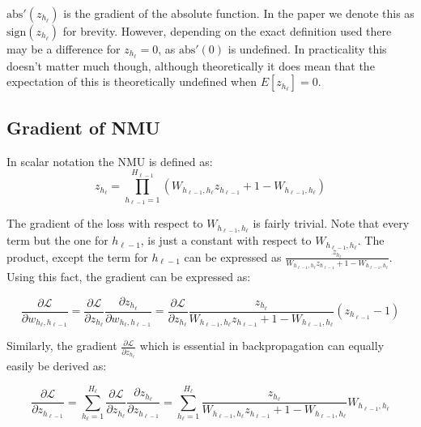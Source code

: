 $\mathrm{abs}'(z_{h_{\ell}})$ is the gradient of the absolute function. In the paper we denote this as $\mathrm{sign}(z_{h_{\ell}})$ for brevity. However, depending on the exact definition used there may be a difference for $z_{h_{\ell}} = 0$, as $\mathrm{abs}'(0)$ is undefined. In practicality this doesn't matter much though, although theoretically it does mean that the expectation of this is theoretically undefined when $E[z_{h_{\ell}}] = 0$.

\subsection{Gradient of NMU}
\label{sec:appendix:gradient-derivatives:gradient-nmu}

In scalar notation the NMU is defined as:
\begin{equation}
z_{h_\ell} = \prod_{h_{\ell-1}=1}^{H_{\ell-1}} \left(W_{h_{\ell-1},h_\ell} z_{h_{\ell-1}} + 1 - W_{h_{\ell-1},h_\ell} \right)
\end{equation}

The gradient of the loss with respect to $W_{h_{\ell-1},h_\ell}$ is fairly trivial. Note that every term but the one for $h_{\ell-1}$, is just a constant with respect to $W_{h_{\ell-1},h_\ell}$. The product, except the term for $h_{\ell-1}$ can be expressed as $\frac{z_{h_\ell}}{W_{h_{\ell-1},h_\ell} z_{h_{\ell-1}} + 1 - W_{h_{\ell-1},h_\ell}}$. Using this fact, the gradient can be expressed as:

\begin{equation}
\frac{\partial \mathcal{L}}{\partial w_{h_{\ell}, h_{\ell - 1}}} = \frac{\partial \mathcal{L}}{\partial z_{h_\ell}} \frac{\partial z_{h_\ell}}{\partial w_{h_{\ell}, h_{\ell - 1}}} = \frac{\partial \mathcal{L}}{\partial z_{h_\ell}} \frac{z_{h_\ell}}{W_{h_{\ell-1},h_\ell} z_{h_{\ell-1}} + 1 - W_{h_{\ell-1},h_\ell}} \left(z_{h_{\ell-1}} - 1\right)
\end{equation}

Similarly, the gradient $\frac{\partial \mathcal{L}}{\partial z_{h_\ell}}$ which is essential in backpropagation can equally easily be derived as:

\begin{equation}
\frac{\partial \mathcal{L}}{\partial z_{h_{\ell-1}}} = \sum_{h_\ell = 1}^{H_\ell} \frac{\partial \mathcal{L}}{\partial z_{h_\ell}} \frac{\partial z_{h_\ell}}{\partial z_{h_{\ell-1}}} = \sum_{h_\ell = 1}^{H_\ell} \frac{z_{h_\ell}}{W_{h_{\ell-1},h_\ell} z_{h_{\ell-1}} + 1 - W_{h_{\ell-1},h_\ell}} W_{h_{\ell-1},h_\ell}
\end{equation}
